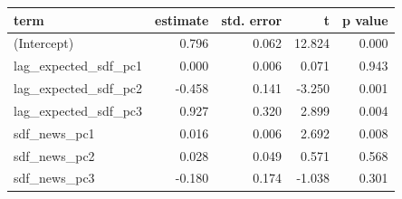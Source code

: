 
\begin{tabular}{lrrrr}
\toprule
term & estimate & std. error & t & p value\\
\midrule
(Intercept) & 0.796 & 0.062 & 12.824 & 0.000\\
lag\_expected\_sdf\_pc1 & 0.000 & 0.006 & 0.071 & 0.943\\
lag\_expected\_sdf\_pc2 & -0.458 & 0.141 & -3.250 & 0.001\\
lag\_expected\_sdf\_pc3 & 0.927 & 0.320 & 2.899 & 0.004\\
sdf\_news\_pc1 & 0.016 & 0.006 & 2.692 & 0.008\\
\addlinespace
sdf\_news\_pc2 & 0.028 & 0.049 & 0.571 & 0.568\\
sdf\_news\_pc3 & -0.180 & 0.174 & -1.038 & 0.301\\
\bottomrule
\end{tabular}
